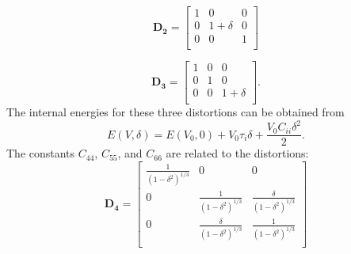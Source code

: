 \begin{equation}
\label{eq_D2}
	\mathbf{D_2} = \begin{bmatrix}
						1 & 0 & 0 \\
						0 & 1+\delta & 0 \\
						0 & 0 & 1 \\
					\end{bmatrix}
\end{equation}

\begin{equation}
\label{eq_D3}
\mathbf{D_3} =  \begin{bmatrix}
						1 & 0 & 0 \\
						0 & 1 & 0 \\
						0 & 0 & 1+\delta \\
						\end{bmatrix}.
\end{equation}
The internal energies for these three distortions can be obtained from 
\begin{equation}
\label{eq_d1d2d3}
E(V,\delta) = E(V_0,0) + V_0\tau_i \delta + \frac{V_0C_{ii}\delta^2}{2}.
\end{equation}
The constants $C_{44}$, $C_{55}$, and $C_{66}$ are related to the distortions:
\begin{equation}
\label{eq_D4}
	\mathbf{D_4} = \begin{bmatrix}
						\frac{1}{(1-\delta^2)^{1/3}} & 0 & 0 \\
						0 & \frac{1}{(1-\delta^2)^{1/3}} & \frac{\delta}{(1-\delta^2)^{1/3}} \\
						0 & \frac{\delta}{(1-\delta^2)^{1/3}} & \frac{1}{(1-\delta^2)^{1/3}} \\
						\end{bmatrix}
\end{equation} 

